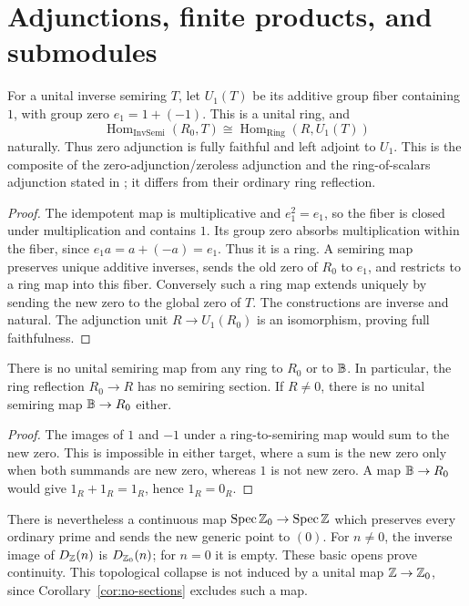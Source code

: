 \section{Adjunctions, finite products, and submodules}
\label{sec:furtherfoundations}
\begin{proposition}\label{prop:unitfiberadjunction}
For a unital inverse semiring $T$, let $U_1(T)$ be its additive group fiber
containing $1$, with group zero $e_1=1+(-1)$. This is a unital ring, and
\[
 \operatorname{Hom}_{\mathrm{InvSemi}}(R_0,T)
 \cong\operatorname{Hom}_{\mathrm{Ring}}(R,U_1(T))
\]
naturally. Thus zero adjunction is fully faithful and left adjoint to
$U_1$. This is the composite of the zero-adjunction/zeroless adjunction
and the ring-of-scalars adjunction stated in \cite[Definition 3.6,
Section 3.1, Proposition 4.7 and Remark 4.14]{FGJM}; it differs from their
ordinary ring reflection.
\end{proposition}
\begin{proof}
The idempotent map is multiplicative and $e_1^2=e_1$, so the fiber is
closed under multiplication and contains $1$. Its group zero absorbs
multiplication within the fiber, since $e_1a=a+(-a)=e_1$. Thus it is a
ring. A semiring map preserves unique additive inverses, sends the old
zero of $R_0$ to $e_1$, and restricts to a ring map into this fiber. Conversely
such a ring map extends uniquely by sending the new zero to the global
zero of $T$. The constructions are inverse and natural. The adjunction
unit $R\to U_1(R_0)$ is an isomorphism, proving full faithfulness.
\end{proof}

\begin{corollary}\label{cor:no-sections}
There is no unital semiring map from any ring to $R_0$ or to $\mathbb B$.
In particular, the ring reflection $R_0\to R$ has no semiring section.
If $R\ne0$, there is no unital semiring map $\mathbb B\to R_0$ either.
\end{corollary}
\begin{proof}
The images of $1$ and $-1$ under a ring-to-semiring map would sum to the
new zero. This is impossible in either target, where a sum is the new
zero only when both summands are new zero, whereas $1$ is not new zero.
A map $\mathbb B\to R_0$ would give $1_R+1_R=1_R$, hence $1_R=0_R$.
\end{proof}

There is nevertheless a continuous map
$\operatorname{Spec}\mathbb Z_0\to\operatorname{Spec}\mathbb Z$ which preserves every ordinary prime and sends the
new generic point to $(0)$. For $n\ne0$, the inverse image of
$D_{\mathbb Z}(n)$ is $D_{\mathbb Z_0}(n)$; for $n=0$ it is empty. These basic opens
prove continuity. This topological collapse is not induced by a unital
map $\mathbb Z\to\mathbb Z_0$, since Corollary~\ref{cor:no-sections} excludes such a map.

